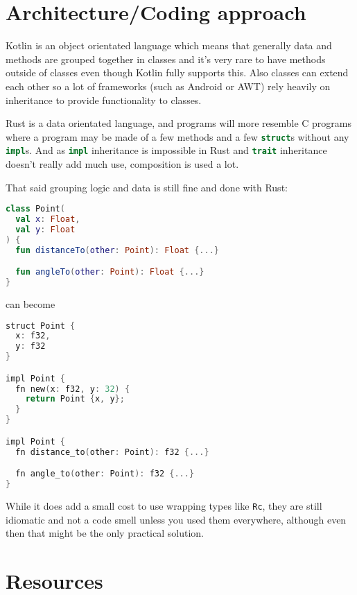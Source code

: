\documentclass[a4paper,11pt]{article}
\begin{document}
\newpage
\section{Architecture/Coding approach}

Kotlin is an object orientated language which means that generally data and methods are grouped together in classes and it's very rare to have methods outside of classes even though Kotlin fully supports this. Also classes can extend each other so a lot of frameworks (such as Android or AWT) rely heavily on inheritance to provide functionality to classes.

Rust is a data orientated language, and programs will more resemble C programs where a program may be made of a few methods and a few \lstinline[language=Rust]{struct}s without any \lstinline[language=Rust]{impl}s.
And as \lstinline[language=Rust]{impl} inheritance is impossible in Rust and \lstinline[language=Rust]{trait} inheritance doesn't really add much use, composition is used a lot.
\newline

That said grouping logic and data is still fine and done with Rust:

\begin{lstlisting}[language=Kotlin,frame=single]
class Point(
  val x: Float,
  val y: Float
) {
  fun distanceTo(other: Point): Float {...}

  fun angleTo(other: Point): Float {...}
}
\end{lstlisting}
can become
\begin{lstlisting}[language=Kotlin,frame=single]
struct Point {
  x: f32,
  y: f32
}

impl Point {
  fn new(x: f32, y: 32) {
    return Point {x, y};
  }
}

impl Point {
  fn distance_to(other: Point): f32 {...}

  fn angle_to(other: Point): f32 {...}
}
\end{lstlisting}

While it does add a small cost to use wrapping types like \lstinline[language=Rust]{Rc}, they are still idiomatic and not a code smell unless you used them everywhere, although even then that might be the only practical solution. 

\newpage
\section{Resources}
\end{document}
